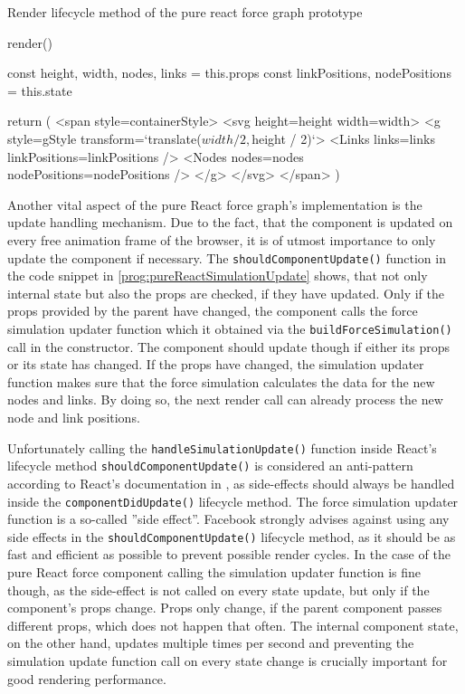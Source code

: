 \begin{program}
\caption{Render lifecycle method of the pure react force graph prototype}
\label{prog:pureReactRender}
\begin{JsCode}
render() {
  const { height, width, nodes, links } = this.props
  const { linkPositions, nodePositions } = this.state
  
  return (
    <span style={containerStyle}>
      <svg height={height} width={width}>
        <g style={gStyle} transform={`translate(${width / 2},${height / 2})`}>
          <Links links={links} linkPositions={linkPositions} />
          <Nodes nodes={nodes} nodePositions={nodePositions} />
        </g>
      </svg>
    </span>
  )
}
\end{JsCode}
\end{program}

Another vital aspect of the pure React force graph's implementation is the update handling mechanism. Due to the fact, that the component is updated on every free animation frame of the browser, it is of utmost importance to only update the component if necessary. The \texttt{shouldComponentUpdate()} function in the code snippet in \ref{prog:pureReactSimulationUpdate} shows, that not only internal state but also the props are checked, if they have updated. Only if the props provided by the parent have changed, the component calls the force simulation updater function which it obtained via the \texttt{buildForceSimulation()} call in the constructor. The component should update though if either its props or its state has changed. If the props have changed, the simulation updater function makes sure that the force simulation calculates the data for the new nodes and links. By doing so, the next render call can already process the new node and link positions.

Unfortunately calling the \texttt{handleSimulationUpdate()} function inside React's lifecycle method \texttt{shouldComponentUpdate()} is considered an anti-pattern according to React's documentation in \cite[/docs/react-component.html]{React}, as side-effects should always be handled inside the \texttt{componentDidUpdate()} lifecycle method. The force simulation updater function is a so-called ''side effect''. Facebook strongly advises against using any side effects in the \texttt{shouldComponentUpdate()} lifecycle method, as it should be as fast and efficient as possible to prevent possible render cycles. In the case of the pure React force component calling the simulation updater function is fine though, as the side-effect is not called on every state update, but only if the component's props change. Props only change, if the parent component passes different props, which does not happen that often. The internal component state, on the other hand, updates multiple times per second and preventing the simulation update function call on every state change is crucially important for good rendering performance.


